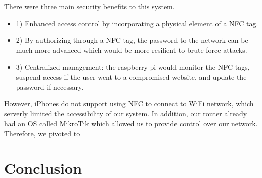 \documentclass[sigconf]{acmart}
\begin{document}
There were three main security benefits to this system. 

\begin{itemize}
    \item 1) Enhanced access control by incorporating a physical element of a NFC tag. 
    \item 2) By authorizing through a NFC tag, the password to the network can be much more advanced which would be more resilient to brute force attacks. 
    \item 3) Centralized management: the raspberry pi would monitor the NFC tags, suspend access if the user went to a compromised website, and update the password if necessary. 
\end{itemize}

However, iPhones do not support using NFC to connect to WiFi network, which serverly limited the accessibility of our system. In addition, our router already had an OS called MikroTik which allowed us to provide control over our network. Therefore, we pivoted to




\section{Conclusion}


\end{document}
